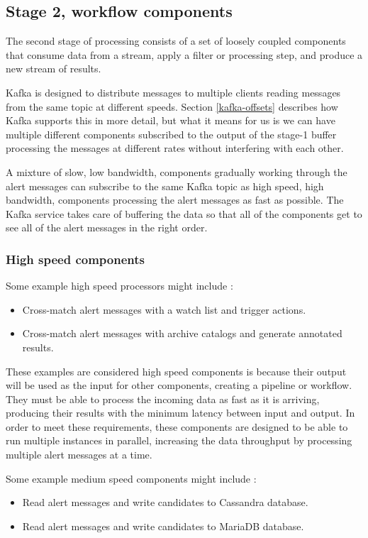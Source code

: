 \documentclass{article}
\newcommand{\kafka} {Kafka\xspace}
\newcommand{\cassandra} {Cassandra\xspace}
\newcommand{\mariadb} {MariaDB\xspace}
\newcommand{\stageone} {stage-1\xspace}
\begin{document}
\subsection{Stage 2, workflow components}
\label{stage-2}
The second stage of processing consists of a set of loosely coupled components that consume data from a stream, apply a filter or processing step, and produce a new stream of results.

\kafka is designed to distribute messages to multiple clients reading messages from the same topic at different speeds. Section \ref{kafka-offsets} describes how \kafka supports this in more detail, but what it means for us is we can have multiple different components subscribed to the output of the \stageone buffer processing the messages at different rates without interfering with each other.

A mixture of slow, low bandwidth, components gradually working through the alert messages can subscribe to the same \kafka topic as high speed, high bandwidth, components processing the alert messages as fast as possible. The \kafka service takes care of buffering the data so that all of the components get to see all of the alert messages in the right order.

\subsubsection{High speed components}
\label{stage-2.high-speed.components}

Some example high speed processors might include :
\begin{itemize}
  \item Cross-match alert messages with a watch list and trigger actions.
  \item Cross-match alert messages with archive catalogs and generate annotated results.
\end{itemize}

These examples are considered high speed components is because their output will be used as the input for other components, creating a pipeline or workflow.
They must be able to process the incoming data as fast as it is arriving, producing their results with the minimum latency between input and output.
In order to meet these requirements, these components are designed to be able to run multiple instances in parallel, increasing the data throughput by processing multiple alert messages at a time.

Some example medium speed components might include :
\begin{itemize}
  \item Read alert messages and write candidates to \cassandra database.
  \item Read alert messages and write candidates to \mariadb database.
\end{itemize}
\end{document}
